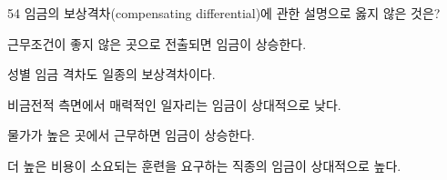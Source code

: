 \begin{question}{54}
임금의 보상격차(compensating differential)에 관한 설명으로 옳지 않은 것은?
\begin{choices}
  \item 근무조건이 좋지 않은 곳으로 전출되면 임금이 상승한다.
  \item 성별 임금 격차도 일종의 보상격차이다.
  \item 비금전적 측면에서 매력적인 일자리는 임금이 상대적으로 낮다.
  \item 물가가 높은 곳에서 근무하면 임금이 상승한다.
  \item 더 높은 비용이 소요되는 훈련을 요구하는 직종의 임금이 상대적으로 높다.
\end{choices}
\end{question}
